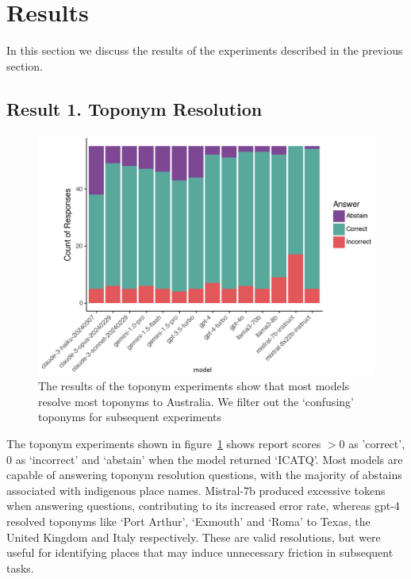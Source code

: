 

\section{Results}
\label{section:results}

In this section we discuss the results of the experiments described in the previous section.

\subsection{Result 1. Toponym Resolution}

\begin{figure}
    \centering
    \includegraphics[width=\columnwidth]{figures/toponym_bar_state}
    \caption{The results of the toponym experiments show that most models resolve most toponyms to Australia. We filter out the `confusing' toponyms for subsequent experiments}
    \label{fig:toponym}
\end{figure}

The toponym experiments shown in figure~\ref{fig:toponym} shows report scores $>0$ as 'correct', $0$ as `incorrect' and `abstain' when the model returned `ICATQ'. 
Most models are capable of answering toponym resolution questions, with the majority of abstains associated with indigenous place names. 
Mistral-7b produced excessive tokens when answering questions, contributing to its increased error rate, whereas gpt-4 resolved toponyms like `Port Arthur', `Exmouth' and `Roma' to Texas, the United Kingdom and Italy respectively.
These are valid resolutions, but were useful for identifying places that may induce unnecessary friction in subsequent tasks.

